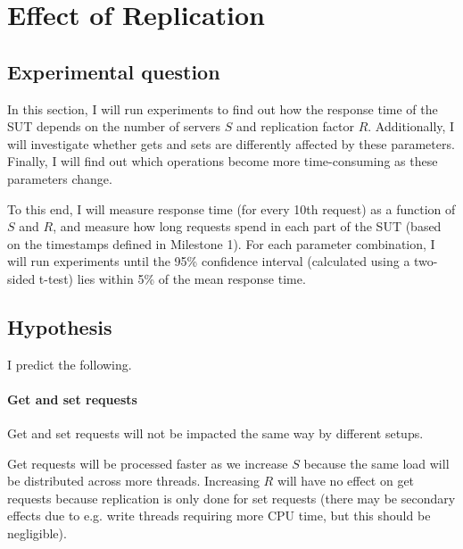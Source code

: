\documentclass[11pt]{article}
\begin{document}
\clearpage
\section{Effect of Replication}
\label{sec:exp2}

\subsection{Experimental question}

In this section, I will run experiments to find out how the response time of the SUT depends on the number of servers $S$ and replication factor $R$. Additionally, I will investigate whether gets and sets are differently affected by these parameters. Finally, I will find out which operations become more time-consuming as these parameters change.

To this end, I will measure response time (for every 10th request) as a function of $S$ and $R$, and measure how long requests spend in each part of the SUT (based on the timestamps defined in Milestone 1). For each parameter combination, I will run experiments until the 95\% confidence interval (calculated using a two-sided t-test) lies within 5\% of the mean response time.

\subsection{Hypothesis}

I predict the following.

\paragraph{Get and set requests}
Get and set requests will not be impacted the same way by different setups.

Get requests will be processed faster as we increase $S$ because the same load will be distributed across more threads. Increasing $R$ will have no effect on get requests because replication is only done for set requests (there may be secondary effects due to e.g. write threads requiring more CPU time, but this should be negligible).
\end{document}
